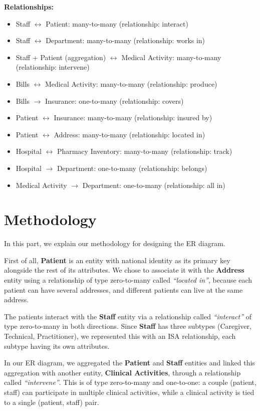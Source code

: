 \documentclass[a4paper,12pt]{article}
\begin{document}
\textbf{Relationships:}
\begin{itemize}
    \item Staff $\leftrightarrow$ Patient: many-to-many (relationship: interact)
    \item Staff $\leftrightarrow$ Department: many-to-many (relationship: works in)
    \item Staff + Patient (aggregation) $\leftrightarrow$ Medical Activity: many-to-many (relationship: intervene)
    \item Bills $\leftrightarrow$ Medical Activity: many-to-many (relationship: produce)
    \item Bills $\rightarrow$ Insurance: one-to-many (relationship: covers)
    \item Patient $\leftrightarrow$ Insurance: many-to-many (relationship: insured by)
    \item Patient $\leftrightarrow$ Address: many-to-many (relationship: located in)
    \item Hospital $\leftrightarrow$ Pharmacy Inventory: many-to-many (relationship: track)
    \item Hospital $\rightarrow$ Department: one-to-many (relationship: belongs)
    \item Medical Activity $\rightarrow$ Department: one-to-many (relationship: all in)
\end{itemize}

\section{Methodology}
In this part, we explain our methodology for designing the ER diagram.

First of all, \textbf{Patient} is an entity with national identity as its primary key alongside the rest of its attributes. We chose to associate it with the \textbf{Address} entity using a relationship of type zero-to-many called \textit{“located in”}, because each patient can have several addresses, and different patients can live at the same address.

The patients interact with the \textbf{Staff} entity via a relationship called \textit{“interact”} of type zero-to-many in both directions. Since \textbf{Staff} has three subtypes (Caregiver, Technical, Practitioner), we represented this with an ISA relationship, each subtype having its own attributes.

In our ER diagram, we aggregated the \textbf{Patient} and \textbf{Staff} entities and linked this aggregation with another entity, \textbf{Clinical Activities}, through a relationship called \textit{“intervene”}. This is of type zero-to-many and one-to-one: a couple (patient, staff) can participate in multiple clinical activities, while a clinical activity is tied to a single (patient, staff) pair.
\end{document}
